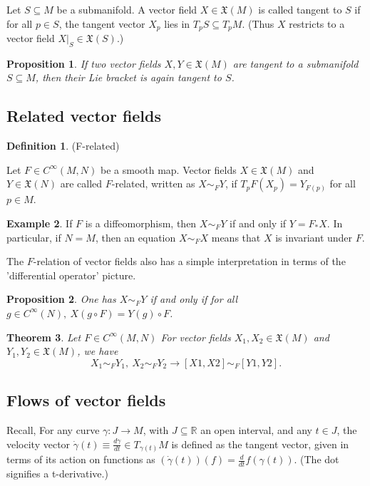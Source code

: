 \documentclass{article}
\newtheorem{theorem}{Theorem}[section]
\newtheorem{proposition}{Proposition}[theorem]
\theoremstyle{definition}
\newtheorem{defn}[theorem]{Definition}
\newtheorem{example}[theorem]{Example}
\newenvironment{definition}
  {\vspace{8pt}\begin{mdframed}[backgroundcolor=blueish,innertopmargin=4]\begin{defn}}
  {\end{defn}\end{mdframed}\vspace{4pt}}
\begin{document}
Let $S \subseteq M$ be a submanifold. A vector field $X \in \mathfrak X(M)$ is called tangent to $S$ if for all $p \in S$, the tangent vector $X_p$ lies in $T_pS \subseteq T_pM$. (Thus $X$ restricts to a vector field $X|_S \in \mathfrak X(S)$.)

\begin{proposition}
If two vector fields $X,Y \in \mathfrak X(M)$ are tangent to a submanifold $S \subseteq M$, then their Lie bracket is again tangent to $S$.
\end{proposition}

\subsection{Related vector fields}

\begin{definition} (F-related)

Let $F \in C^\infty(M,N)$ be a smooth map. Vector fields $X \in \mathfrak X(M)$ and $Y \in \mathfrak X(N)$ are called $F$-related, written as $X \sim_F Y$, if $T_pF(X_p) = Y_{F(p)}$ for all $p \in M$.

\end{definition}

\begin{example}

If $F$ is a diffeomorphism, then $X \sim_F Y$ if and only if $Y = F_* X$. In particular, if $N = M$, then an equation $X \sim_F X$ means that $X$ is invariant under $F$.

\end{example}

The $F$-relation of vector fields also has a simple interpretation in terms of the 'differential operator' picture.

\begin{proposition}
One has $X \sim_F Y$ if and only if for all $g \in C^\infty(N), \ X(g \circ F) = Y(g) \circ F$.

\end{proposition}

\begin{theorem}

Let $F \in C ^\infty(M,N)$ For vector fields $X_1,X_2 \in \mathfrak X(M)$ and $Y_1,Y_2 \in \mathfrak X(M)$, we have 
\[
    X_1 \sim_F Y_1, \ X_2 \sim_F Y_2 \rightarrow [X1,X2] \sim_F [Y1,Y2].
\]
\end{theorem}

\subsection{Flows of vector fields}
Recall, For any curve $\gamma : J \rightarrow M$, with $J \subseteq \mathbb R$ an open interval, and any $t \in J$, the velocity vector $\dot{\gamma}(t) \equiv \frac{d\gamma}{dt} \in T_{\gamma(t)}M$ is defined as the tangent vector, given in terms of its action on functions as $(\dot{\gamma}(t))(f) = \frac{d}{dt} f(\gamma(t))$. (The dot signifies a t-derivative.)
\end{document}

